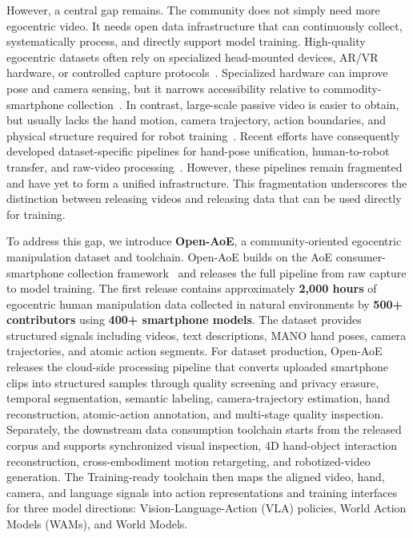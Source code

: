However, a central gap remains.
The community does not simply need more egocentric video.
It needs open data infrastructure that can continuously collect, systematically process, and directly support model training.
High-quality egocentric datasets often rely on specialized head-mounted devices, AR/VR hardware, or controlled capture protocols~\cite{egodex2025,egolive2026}.
Specialized hardware can improve pose and camera sensing, but it narrows accessibility relative to commodity-smartphone collection~\cite{egodex2025,egolive2026,aoe2026}.
In contrast, large-scale passive video is easier to obtain, but usually lacks the hand motion, camera trajectory, action boundaries, and physical structure required for robot training~\cite{egodex2025,openegocentric2025}.
Recent efforts have consequently developed dataset-specific pipelines for hand-pose unification, human-to-robot transfer, and raw-video processing~\cite{openegocentric2025,egoscale2026,aoe2026}. 
However, these pipelines remain fragmented and have yet to form a unified infrastructure. This fragmentation underscores the distinction between releasing videos and releasing data that can be used directly for training.

To address this gap, we introduce \textbf{Open-AoE}, a community-oriented egocentric manipulation dataset and toolchain.
Open-AoE builds on the AoE consumer-smartphone collection framework~\cite{aoe2026} and releases the full pipeline from raw capture to model training.
The first release contains approximately \textbf{2,000 hours} of egocentric human manipulation data collected in natural environments by \textbf{500+ contributors} using \textbf{400+ smartphone models}.
The dataset provides structured signals including videos, text descriptions, MANO hand poses, camera trajectories, and atomic action segments.
For dataset production, Open-AoE releases the cloud-side processing pipeline that converts uploaded smartphone clips into structured samples through quality screening and privacy erasure, temporal segmentation, semantic labeling, camera-trajectory estimation, hand reconstruction, atomic-action annotation, and multi-stage quality inspection.
Separately, the downstream data consumption toolchain starts from the released corpus and supports synchronized visual inspection, 4D hand-object interaction reconstruction, cross-embodiment motion retargeting, and robotized-video generation.
The Training-ready toolchain then maps the aligned video, hand, camera, and language signals into action representations and training interfaces for three model directions: Vision-Language-Action (VLA) policies, World Action Models (WAMs), and World Models.

